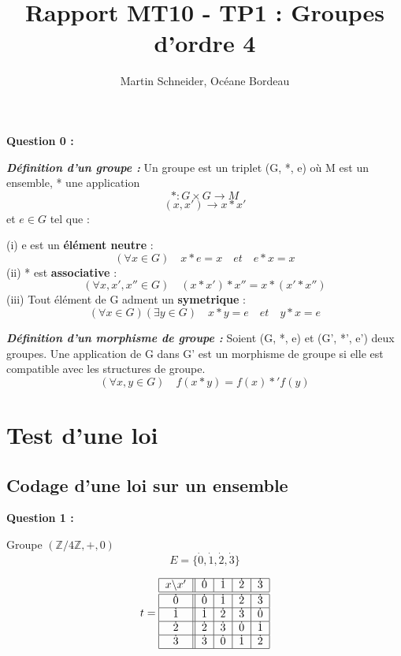 \documentclass[titlepage]{article}
\title{Rapport MT10 - TP1 : Groupes d’ordre 4}
\author{Martin Schneider, Océane Bordeau}
\begin{document}
    \maketitle
    \textbf{Question 0 :}

    \textbf{\emph{Définition d'un groupe :}} Un groupe est un triplet (G, *, e) où M est un ensemble, * une application
    \[*:G \times G \longrightarrow M\]
    \[(x, x') \longrightarrow x*x'\]
    et $e \in G$ tel que : 

    (i) e est un \textbf{élément neutre} : \[(\forall x \in G) \quad x*e=x \quad et \quad e*x=x\]
    (ii) * est \textbf{associative} : \[(\forall x, x', x'' \in G) \quad (x*x')*x''=x*(x'*x'')\]
    (iii) Tout élément de G adment un \textbf{symetrique} : \[(\forall x \in G)(\exists y \in G) \quad x*y=e \quad et \quad y*x=e\]

    \textbf{\emph{Définition d'un morphisme de groupe :}} Soient (G, *, e) et (G', *', e') deux groupes. 
    Une application de G dans G' est un morphisme de groupe si elle est compatible avec les structures de groupe.
    \[(\forall x, y \in G) \quad f(x*y)=f(x)*'f(y)\]

    \section{Test d'une loi}
        \subsection{Codage d'une loi sur un ensemble}
        \textbf{Question 1 :}

        Groupe $(\mathbb{Z}/4\mathbb{Z}, +, 0)$
        \[E = \{\dot{0}, \dot{1}, \dot{2}, \dot{3}\}\]

        \[t=\begin{tabular}{| c || c | c | c | c |}
            \hline
            $x$\textbackslash $x'$ & $\dot{0}$ & $\dot{1}$ & $\dot{2}$ & $\dot{3}$ \\ \hline \hline
            $\dot{0}$ & $\dot{0}$ & $\dot{1}$ & $\dot{2}$ & $\dot{3}$ \\ \hline
            $\dot{1}$ & $\dot{1}$ & $\dot{2}$ & $\dot{3}$ & $\dot{0}$ \\ \hline
            $\dot{2}$ & $\dot{2}$ & $\dot{3}$ & $\dot{0}$ & $\dot{1}$ \\ \hline
            $\dot{3}$ & $\dot{3}$ & $\dot{0}$ & $\dot{1}$ & $\dot{2}$ \\
            \hline
        \end{tabular}\]
\end{document}
